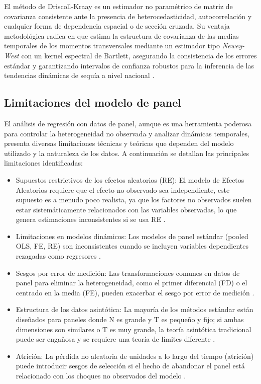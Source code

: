 El método de Driscoll-Kraay es un estimador no paramétrico de matriz de covarianza consistente ante la presencia de heterocedasticidad, autocorrelación y cualquier forma de dependencia espacial o de sección cruzada. Su ventaja metodológica radica en que estima la estructura de covarianza de las medias temporales de los momentos transversales mediante un estimador tipo \textit{Newey-West} con un kernel espectral de Bartlett, asegurando la consistencia de los errores estándar y garantizando intervalos de confianza robustos para la inferencia de las tendencias dinámicas de sequía a nivel nacional \cite{wooldridge2010}. 

\subsection{Limitaciones del modelo de panel}

El análisis de regresión con datos de panel, aunque es una herramienta poderosa para controlar la heterogeneidad no observada y analizar dinámicas temporales, presenta diversas limitaciones técnicas y teóricas que dependen del modelo utilizado y la naturaleza de los datos. A continuación se detallan las principales limitaciones identificadas:
\begin{itemize}
    \item {Supuestos restrictivos de los efectos aleatorios (RE):} El modelo de Efectos Aleatorios requiere que el efecto no observado sea independiente, este supuesto es a menudo poco realista, ya que los factores no observados suelen estar sistemáticamente relacionados con las variables observadas, lo que genera estimaciones inconsistentes si se usa RE \cite{wooldridge2010}.
    \item {Limitaciones en modelos dinámicos:} Los modelos de panel estándar (pooled OLS, FE, RE) son inconsistentes cuando se incluyen variables dependientes rezagadas como regresores \cite{wooldridge2010}.
    \item {Sesgos por error de medición:} Las transformaciones comunes en datos de panel para eliminar la heterogeneidad, como el primer diferencial (FD) o el centrado en la media (FE), pueden exacerbar el sesgo por error de medición \cite{wooldridge2010}.
    \item {Estructura de los datos asintótica:} La mayoría de los métodos estándar están diseñados para paneles donde N es grande y T es pequeño y fijo; si ambas dimensiones son similares o T es muy grande, la teoría asintótica tradicional puede ser engañosa y se requiere una teoría de límites diferente \cite{wooldridge2010}.
    \item {Atrición:} La pérdida no aleatoria de unidades a lo largo del tiempo (atrición) puede introducir sesgos de selección si el hecho de abandonar el panel está relacionado con los choques no observados del modelo \cite{wooldridge2010}.
\end{itemize}


